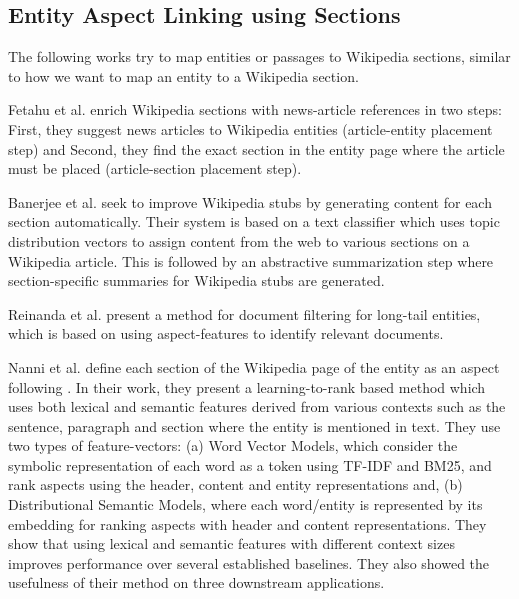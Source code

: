 
\subsection{Entity Aspect Linking using Sections} 
The following works try to map entities or passages to Wikipedia sections, similar to how we want to map an entity to a Wikipedia section.

Fetahu et al. \cite{fetahu2015automated} enrich Wikipedia sections with news-article references in two steps: First, they suggest news articles to Wikipedia entities (article-entity placement step) and Second, they find the exact section in the entity page where the article must be placed (article-section placement step).

Banerjee et al. \cite{banerjee2015wikikreator} seek to improve Wikipedia stubs by generating content for each section automatically. Their system is based on a text classifier which uses topic distribution vectors to assign content from the web to various sections on a Wikipedia article. This is followed by an abstractive summarization step where section-specific summaries for Wikipedia stubs are generated.

Reinanda et al. \cite{reinanda2016document} present a method for document filtering for long-tail entities, which is based on using aspect-features to identify relevant documents. 

Nanni et al. \cite{nanni2018entity} define each section of the Wikipedia page of the entity as an aspect following \cite{fetahu2015automated,banerjee2015wikikreator,reinanda2016document}.
In their work, they present a learning-to-rank based method which uses both lexical and semantic features derived from various contexts such as the sentence, paragraph and section where the entity is mentioned in text. They use two types of feature-vectors: (a) Word Vector Models, which consider the symbolic representation of each word as a token using TF-IDF and BM25, and rank aspects using the header, content and entity representations and, (b) Distributional Semantic Models, where each word/entity is represented by its embedding for ranking aspects with header and content representations. They show that using lexical and semantic features with different context sizes improves performance over several established baselines. They also showed the usefulness of their method on three downstream applications.  


